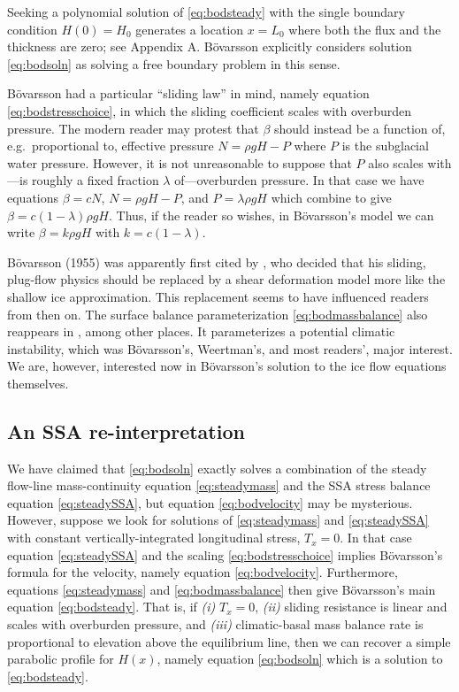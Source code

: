 \documentclass[twocolumn]{igs}
\renewcommand{\dh}{\fontencoding{T1}\selectfont{\symbol{240}}}
\newcommand{\bod}{B\"o\dh varsson\xspace}
\newcommand{\citebod}{B\"o\dh varsson (1955)\nocite{Bodvardsson}\xspace}
\begin{document}
Seeking a polynomial solution of \eqref{eq:bodsteady} with the single boundary condition $H(0)=H_0$ generates a location $x=L_0$ where both the flux and the thickness are zero; see Appendix A.  \bod explicitly considers solution \eqref{eq:bodsoln} as solving a free boundary problem in this sense.

\bod had a particular ``sliding law'' in mind, namely equation \eqref{eq:bodstresschoice}, in which the sliding coefficient scales with overburden pressure.  The modern reader may protest that $\beta$ should instead be a function of, e.g.~proportional to, effective pressure $N=\rho g H - P$ where $P$ is the subglacial water pressure.  However, it is not unreasonable to suppose that $P$ also scales with---is roughly a fixed fraction $\lambda$ of---overburden pressure.  In that case we have equations $\beta = c N$, $N=\rho g H - P$, and $P = \lambda \rho g H$ which combine to give $\beta = c (1-\lambda) \rho g H$.  Thus, if the reader so wishes, in \bod's model we can write $\beta = k \rho g H$ with $k=c (1-\lambda)$.

\citebod was apparently first cited by \cite{Weertman61stability}, who decided that his sliding, plug-flow physics should be replaced by a shear deformation model more like the shallow ice approximation.  This replacement seems to have influenced readers from then on.  The surface balance parameterization \eqref{eq:bodmassbalance} also reappears in \cite{Weertman61stability}, among other places.  It parameterizes a potential climatic instability, which was \bod's, Weertman's, and most readers', major interest.  We are, however, interested now in \bod's solution to the ice flow equations themselves.


\subsection*{An SSA re-interpretation}  We have claimed that \eqref{eq:bodsoln} exactly solves a combination of the steady flow-line mass-continuity equation \eqref{eq:steadymass} and the SSA stress balance equation \eqref{eq:steadySSA}, but equation \eqref{eq:bodvelocity} may be mysterious.  However, suppose we look for solutions of \eqref{eq:steadymass} and \eqref{eq:steadySSA} with constant vertically-integrated longitudinal stress, $T_x = 0$.  In that case equation \eqref{eq:steadySSA} and the scaling \eqref{eq:bodstresschoice} implies \bod's formula for the velocity, namely equation \eqref{eq:bodvelocity}.  Furthermore, equations \eqref{eq:steadymass} and \eqref{eq:bodmassbalance} then give \bod's main equation \eqref{eq:bodsteady}.  That is, if \emph{(i)} $T_x = 0$, \emph{(ii)} sliding resistance is linear and scales with overburden pressure, and \emph{(iii)} climatic-basal mass balance rate is proportional to elevation above the equilibrium line, then we can recover a simple parabolic profile for $H(x)$, namely equation \eqref{eq:bodsoln} which is a solution to \eqref{eq:bodsteady}.
\end{document}

